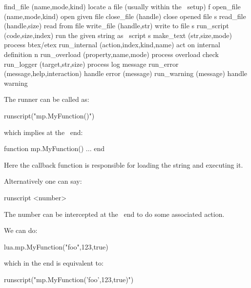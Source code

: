 \starttabulate[|T|T|T|p|]
    \HL
    \NC   \NC find_file    \NC (name,mode,kind)           \NC locate a file (usually within the \TDS\ setup) \NC \NR
    \NC f \NC open_file    \NC (name,mode,kind)           \NC open given file \NC \NR
    \NC   \NC close_file   \NC (handle)                   \NC close opened file \NC \NR
    \NC s \NC read_file    \NC (handle,size)              \NC read from file \NC \NR
    \NC   \NC write_file   \NC (handle,str)               \NC write to file \NC \NR
    \HL
    \NC s \NC run_script   \NC (code,size,index)          \NC run the given string as \LUA\ script \NC \NR
    \NC s \NC make_text    \NC (str,size,mode)            \NC process btex/etex \NC \NR
    \HL
    \NC   \NC run_internal \NC (action,index,kind,name)   \NC act on internal definition \NC \NR
    \HL
    \NC n \NC run_overload \NC (property,name,mode)       \NC process overload check \NC \NR
    \HL
    \NC   \NC run_logger   \NC (target,str,size)          \NC process log message \NC \NR
    \NC   \NC run_error    \NC (message,help,interaction) \NC handle error (message) \NC \NR
    \NC   \NC run_warning  \NC (message)                  \NC handle warning \NC \NR
    \HL
\stoptabulate


\stoptitle

\starttitle[title=Two calling methods]

The runner can be called as:

\starttyping
runscript("mp.MyFunction()")
\stoptyping

which implies at the \LUA\ end:

\starttyping
function mp.MyFunction()
    ...
end
\stoptyping

Here the callback function is responsible for loading the string and executing it.

Alternatively one can say:

\starttyping
runscript <number>
\stoptyping

The number can be intercepted at the \LUA\ end to do some associated action.

\stoptitle

\starttitle[title=Variables]

We can do:

\starttyping
lua.mp.MyFunction("foo",123,true)
\stoptyping

which in the end is equivalent to:

\starttyping
runscript("mp.MyFunction('foo',123,true)")
\stoptyping

